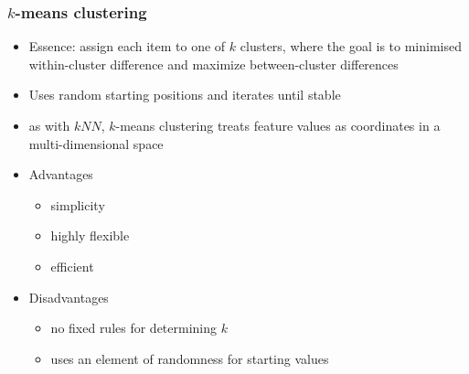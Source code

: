 \documentclass{beamer}
\begin{document}
\begin{frame}
	\frametitle{$k$-means clustering}
	\begin{itemize}
		\item Essence: assign each item to one of $k$ clusters, where the
		goal is to minimised within-cluster difference and maximize
		between-cluster differences
		\item Uses random starting positions and iterates until stable
		\item as with $kNN$, $k$-means clustering treats feature values as
		coordinates in a multi-dimensional space
		\item \pause Advantages
		\begin{itemize}
			\item simplicity
			\item highly flexible
			\item efficient
		\end{itemize}
		\item \pause Disadvantages
		\begin{itemize}
			\item no fixed rules for determining $k$
			\item uses an element of randomness for starting values
		\end{itemize}
	\end{itemize}
\end{frame}
\end{document}
